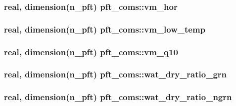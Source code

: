 \subsubsection[{\texorpdfstring{vm\+\_\+hor}{vm_hor}}]{\setlength{\rightskip}{0pt plus 5cm}real, dimension(n\+\_\+pft) pft\+\_\+coms\+::vm\+\_\+hor}\hypertarget{namespacepft__coms_a1424943ac59ffe1e85af3d7eeca315bb}{}\label{namespacepft__coms_a1424943ac59ffe1e85af3d7eeca315bb}
\subsubsection[{\texorpdfstring{vm\+\_\+low\+\_\+temp}{vm_low_temp}}]{\setlength{\rightskip}{0pt plus 5cm}real, dimension(n\+\_\+pft) pft\+\_\+coms\+::vm\+\_\+low\+\_\+temp}\hypertarget{namespacepft__coms_abc805ab81f6ae61cf4ccfb36fd352fdc}{}\label{namespacepft__coms_abc805ab81f6ae61cf4ccfb36fd352fdc}
\subsubsection[{\texorpdfstring{vm\+\_\+q10}{vm_q10}}]{\setlength{\rightskip}{0pt plus 5cm}real, dimension(n\+\_\+pft) pft\+\_\+coms\+::vm\+\_\+q10}\hypertarget{namespacepft__coms_a47018d91ecb1fe0c547ec131348e5fdd}{}\label{namespacepft__coms_a47018d91ecb1fe0c547ec131348e5fdd}
\subsubsection[{\texorpdfstring{wat\+\_\+dry\+\_\+ratio\+\_\+grn}{wat_dry_ratio_grn}}]{\setlength{\rightskip}{0pt plus 5cm}real, dimension(n\+\_\+pft) pft\+\_\+coms\+::wat\+\_\+dry\+\_\+ratio\+\_\+grn}\hypertarget{namespacepft__coms_a93b820778e953be06816231daa419ca5}{}\label{namespacepft__coms_a93b820778e953be06816231daa419ca5}
\subsubsection[{\texorpdfstring{wat\+\_\+dry\+\_\+ratio\+\_\+ngrn}{wat_dry_ratio_ngrn}}]{\setlength{\rightskip}{0pt plus 5cm}real, dimension(n\+\_\+pft) pft\+\_\+coms\+::wat\+\_\+dry\+\_\+ratio\+\_\+ngrn}\hypertarget{namespacepft__coms_a4228db82826a9e2afbe3646586c0c4ac}{}\label{namespacepft__coms_a4228db82826a9e2afbe3646586c0c4ac}
